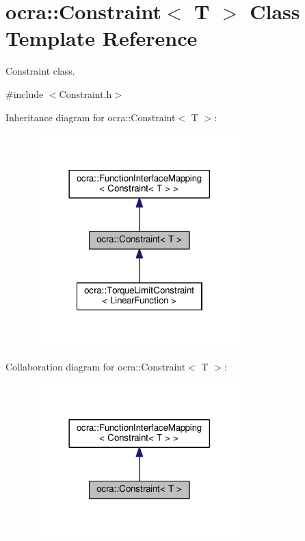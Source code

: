 \hypertarget{classocra_1_1Constraint}{}\section{ocra\+:\+:Constraint$<$ T $>$ Class Template Reference}
\label{classocra_1_1Constraint}


Constraint class.  




{\ttfamily \#include $<$Constraint.\+h$>$}



Inheritance diagram for ocra\+:\+:Constraint$<$ T $>$\+:
\nopagebreak
\begin{figure}[H]
\begin{center}
\leavevmode
\includegraphics[width=234pt]{d9/d1a/classocra_1_1Constraint__inherit__graph}
\end{center}
\end{figure}


Collaboration diagram for ocra\+:\+:Constraint$<$ T $>$\+:
\nopagebreak
\begin{figure}[H]
\begin{center}
\leavevmode
\includegraphics[width=234pt]{d9/df5/classocra_1_1Constraint__coll__graph}
\end{center}
\end{figure}
